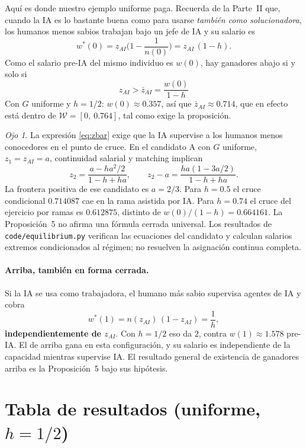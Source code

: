 \documentclass[11pt]{article}
\theoremstyle{definition}
\theoremstyle{remark}
\newtheorem*{ojo}{Ojo}
\newcommand{\zai}{z_{AI}}
\newcommand{\W}{\mathcal W}
\begin{document}
Aquí es donde nuestro ejemplo uniforme paga. Recuerda de la Parte~II que, cuando la IA es lo bastante
buena como para usarse \emph{también como solucionadora}, los humanos menos sabios trabajan bajo un jefe
de IA y su salario es
\[
  w^{*}(0)=\zai\Big(1-\frac{1}{n(0)}\Big)=\zai\,(1-h).
\]
Como el salario pre-IA del mismo individuo es $w(0)$, hay ganadores abajo si y solo si
\begin{equation}\label{eq:zbar}
  \boxed{\ \zai>\bar z_{AI}=\frac{w(0)}{1-h}\ }
\end{equation}
Con $G$ uniforme y $h=1/2$: $w(0)\approx0.357$, así que $\bar z_{AI}\approx0.714$, que en efecto está
dentro de $\W=[0,\ 0.764]$, tal como exige la proposición.

\begin{ojo}
La expresión \eqref{eq:zbar} exige que la IA supervise a los humanos menos conocedores
en el punto de cruce. En el candidato A con $G$ uniforme, $z_1=\zai=a$, continuidad salarial y matching
implican
\[
 z_2=\frac{a-ha^2/2}{1-h+ha},\qquad
 z_2-a=\frac{ha(1-3a/2)}{1-h+ha}.
\]
La frontera positiva de ese candidato es $a=2/3$. Para $h=0.5$ el cruce condicional
$0.714087$ cae en la rama asistida por IA. Para $h=0.74$ el cruce del ejercicio por ramas
es $0.612875$, distinto de $w(0)/(1-h)=0.664161$.
La Proposición~5 no afirma una fórmula cerrada universal. Los resultados de
\texttt{code/equilibrium.py} verifican las ecuaciones del candidato y calculan salarios
extremos condicionados al régimen; no resuelven la asignación continua completa.
\end{ojo}

\paragraph{Arriba, también en forma cerrada.} Si la IA se usa como trabajadora, el humano más sabio
supervisa agentes de IA y cobra
\[
  w^{*}(1)=n(\zai)\,(1-\zai)=\frac{1}{h},
\]
\textbf{independientemente de $\zai$}. Con $h=1/2$ eso da $2$, contra $w(1)\approx1.578$ pre-IA. El de
arriba gana en esta configuración, y su salario es independiente de la capacidad mientras supervise IA. El resultado general de existencia de ganadores arriba es la Proposición~5 bajo sus hipótesis.

\section{Tabla de resultados (uniforme, \texorpdfstring{$h=1/2$}{h=1/2})}
\end{document}
